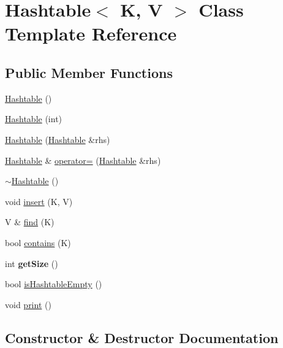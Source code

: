 \hypertarget{classHashtable}{}\section{Hashtable$<$ K, V $>$ Class Template Reference}
\label{classHashtable}
\subsection*{Public Member Functions}
\begin{DoxyCompactItemize}
\item 
\hyperlink{classHashtable_a2f77d0c6d61286bf8d66552b5ade3f27}{Hashtable} ()
\item 
\hyperlink{classHashtable_ac49d1754f24b9c611c3f2e01ca3ab502}{Hashtable} (int)
\item 
\hyperlink{classHashtable_afe8a9c3e1f2bd6ec37427a4dfeae93b9}{Hashtable} (\hyperlink{classHashtable}{Hashtable} \&rhs)
\item 
\hyperlink{classHashtable}{Hashtable} \& \hyperlink{classHashtable_a8b6f0408333c913886be2be72d453368}{operator=} (\hyperlink{classHashtable}{Hashtable} \&rhs)
\item 
\hyperlink{classHashtable_a3f4057afda4ad0f6b805f900e43b53f6}{$\sim$\+Hashtable} ()
\item 
void \hyperlink{classHashtable_a1c028479d0908b9f3e400084042fe3c2}{insert} (K, V)
\item 
V \& \hyperlink{classHashtable_ad4794ef44984493bcb7f40ffd1da9854}{find} (K)
\item 
bool \hyperlink{classHashtable_a999043d381b8323acc2067f6d9cdc417}{contains} (K)
\item 
int {\bfseries get\+Size} ()\hypertarget{classHashtable_af36d5460e4fd8ff3e52583cc8640480d}{}\label{classHashtable_af36d5460e4fd8ff3e52583cc8640480d}

\item 
bool \hyperlink{classHashtable_a6c264c9819287f9441732ae2b7ef0984}{is\+Hashtable\+Empty} ()
\item 
void \hyperlink{classHashtable_a6674997d6f8c06f0be64552df7a6ed9f}{print} ()
\end{DoxyCompactItemize}


\subsection{Constructor \& Destructor Documentation}
